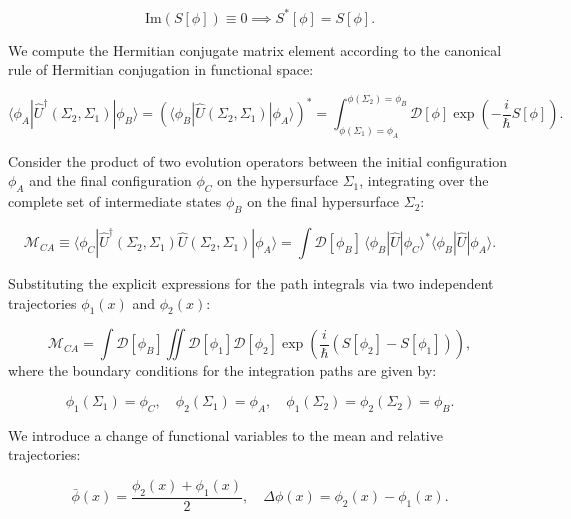 \begin{equation}\label{eq:1.77}\tag{1.77}
\text{Im}(S[\phi]) \equiv 0 \implies S^*[\phi] = S[\phi].
\end{equation}

We compute the Hermitian conjugate matrix element according to the canonical rule of Hermitian conjugation in functional space:

\begin{equation}\label{eq:1.78}\tag{1.78}
\langle \phi_A | \hat{U}^\dagger(\Sigma_2, \Sigma_1) | \phi_B \rangle = \left( \langle \phi_B | \hat{U}(\Sigma_2, \Sigma_1) | \phi_A \rangle \right)^* = \int_{\phi(\Sigma_1)=\phi_A}^{\phi(\Sigma_2)=\phi_B} \mathcal{D}[\phi] \exp\left( -\frac{i}{\hbar} S[\phi] \right).
\end{equation}

Consider the product of two evolution operators between the initial configuration $\phi_A$ and the final configuration $\phi_C$ on the hypersurface $\Sigma_1$, integrating over the complete set of intermediate states $\phi_B$ on the final hypersurface $\Sigma_2$:

\begin{equation}\label{eq:1.79}\tag{1.79}
\mathcal{M}_{CA} \equiv \langle \phi_C | \hat{U}^\dagger(\Sigma_2, \Sigma_1) \hat{U}(\Sigma_2, \Sigma_1) | \phi_A \rangle = \int \mathcal{D}[\phi_B] \, \langle \phi_B | \hat{U} | \phi_C \rangle^* \langle \phi_B | \hat{U} | \phi_A \rangle.
\end{equation}

Substituting the explicit expressions for the path integrals via two independent trajectories $\phi_1(x)$ and $\phi_2(x)$:

\begin{equation}\label{eq:1.80}\tag{1.80}
\mathcal{M}_{CA} = \int \mathcal{D}[\phi_B] \iint \mathcal{D}[\phi_1] \mathcal{D}[\phi_2] \exp\left( \frac{i}{\hbar} \left( S[\phi_2] - S[\phi_1] \right) \right),
\end{equation}
where the boundary conditions for the integration paths are given by:

\begin{equation*}
\phi_1(\Sigma_1) = \phi_C, \quad \phi_2(\Sigma_1) = \phi_A, \quad \phi_1(\Sigma_2) = \phi_2(\Sigma_2) = \phi_B.
\end{equation*}

We introduce a change of functional variables to the mean and relative trajectories:

\begin{equation}\label{eq:1.81}\tag{1.81}
\bar{\phi}(x) = \frac{\phi_2(x) + \phi_1(x)}{2}, \quad \Delta\phi(x) = \phi_2(x) - \phi_1(x).
\end{equation}

